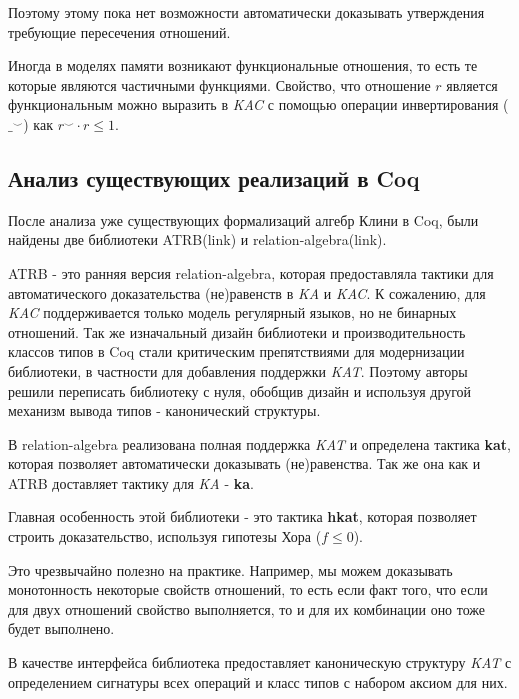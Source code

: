 \documentclass[times
              ]{itmo-student-thesis}
\begin{document}
    Поэтому этому пока нет возможности автоматически доказывать утверждения требующие пересечения отношений.

    Иногда в моделях памяти возникают функциональные отношения, то есть те которые являются частичными функциями. Свойство, что отношение $ r $ является функциональным можно выразить в \textit{KAC} с помощью операции инвертирования ($ \_^{\smile} $) как $ r^{\smile} \cdot r \leq 1 $.

  \subsection{Анализ существующих реализаций в Coq}

    После анализа уже существующих формализаций алгебр Клини в Coq, были найдены две библиотеки ATRB(link) и relation-algebra(link).

    ATRB - это ранняя версия relation-algebra, которая предоставляла тактики для автоматического доказательства (не)равенств в \textit{KA} и \textit{KAC}.
    К сожалению, для \textit{KAC} поддерживается только модель регулярный языков, но не бинарных отношений.
    Так же изначальный дизайн библиотеки и производительность классов типов в Coq стали критическим препятствиями для модернизации библиотеки,
    в частности для добавления поддержки \textit{KAT}.
    Поэтому авторы решили переписать библиотеку с нуля, обобщив дизайн и используя другой механизм вывода типов - канонический структуры.

    В relation-algebra реализована полная поддержка \textit{KAT} и определена тактика \textbf{kat}, которая позволяет автоматически доказывать (не)равенства.
    Так же она как и ATRB доставляет тактику для \textit{KA} - \textbf{ka}.

    Главная особенность этой библиотеки - это тактика \textbf{hkat}, которая позволяет строить доказательство, используя гипотезы Хора ($ f \leq 0 $).

    Это чрезвычайно полезно на практике.
    Например, мы можем доказывать монотонность некоторые свойств отношений,
    то есть если факт того, что если для двух отношений свойство выполняется, то и для их комбинации оно тоже будет выполнено.

    В качестве интерфейса библиотека предоставляет каноническую структуру \textit{KAT} с определением сигнатуры всех операций и класс типов с набором аксиом для них.
\end{document}
